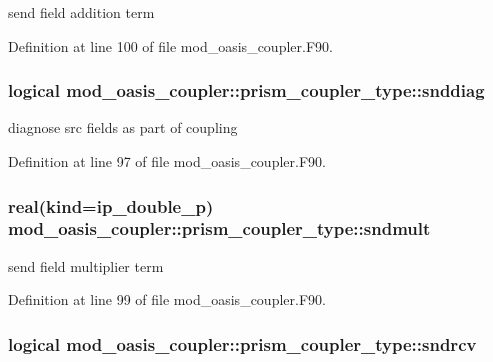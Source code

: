 send field addition term 



Definition at line 100 of file mod\+\_\+oasis\+\_\+coupler.\+F90.

\hypertarget{structmod__oasis__coupler_1_1prism__coupler__type_ae0ad5bd2dfbc17cbdceeda23c92dbebe}{
\subsubsection[{snddiag}]{\setlength{\rightskip}{0pt plus 5cm}logical mod\+\_\+oasis\+\_\+coupler\+::prism\+\_\+coupler\+\_\+type\+::snddiag\hspace{0.3cm}{\ttfamily [private]}}}\label{structmod__oasis__coupler_1_1prism__coupler__type_ae0ad5bd2dfbc17cbdceeda23c92dbebe}


diagnose src fields as part of coupling 



Definition at line 97 of file mod\+\_\+oasis\+\_\+coupler.\+F90.

\hypertarget{structmod__oasis__coupler_1_1prism__coupler__type_ad17bb1c791d2ef48cf7b4abf955bf43b}{
\subsubsection[{sndmult}]{\setlength{\rightskip}{0pt plus 5cm}real(kind=ip\+\_\+double\+\_\+p) mod\+\_\+oasis\+\_\+coupler\+::prism\+\_\+coupler\+\_\+type\+::sndmult\hspace{0.3cm}{\ttfamily [private]}}}\label{structmod__oasis__coupler_1_1prism__coupler__type_ad17bb1c791d2ef48cf7b4abf955bf43b}


send field multiplier term 



Definition at line 99 of file mod\+\_\+oasis\+\_\+coupler.\+F90.

\hypertarget{structmod__oasis__coupler_1_1prism__coupler__type_a45db2da67a23b8a4b693d0b7882996b5}{
\subsubsection[{sndrcv}]{\setlength{\rightskip}{0pt plus 5cm}logical mod\+\_\+oasis\+\_\+coupler\+::prism\+\_\+coupler\+\_\+type\+::sndrcv\hspace{0.3cm}{\ttfamily [private]}}}\label{structmod__oasis__coupler_1_1prism__coupler__type_a45db2da67a23b8a4b693d0b7882996b5}


